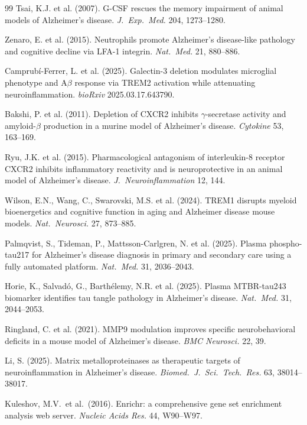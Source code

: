 \documentclass[12pt,a4paper]{article}
\begin{document}
\begin{thebibliography}{99}
 Tsai, K.J. et al. (2007). G-CSF rescues the memory impairment of animal models of Alzheimer's disease. \textit{J.\ Exp.\ Med.} 204, 1273--1280.

 Zenaro, E. et al. (2015). Neutrophils promote Alzheimer's disease-like pathology and cognitive decline via LFA-1 integrin. \textit{Nat.\ Med.} 21, 880--886.

 Camprub\'i-Ferrer, L. et al. (2025). Galectin-3 deletion modulates microglial phenotype and A$\beta$ response via TREM2 activation while attenuating neuroinflammation. \textit{bioRxiv} 2025.03.17.643790.

 Bakshi, P. et al. (2011). Depletion of CXCR2 inhibits $\gamma$-secretase activity and amyloid-$\beta$ production in a murine model of Alzheimer's disease. \textit{Cytokine} 53, 163--169.

 Ryu, J.K. et al. (2015). Pharmacological antagonism of interleukin-8 receptor CXCR2 inhibits inflammatory reactivity and is neuroprotective in an animal model of Alzheimer's disease. \textit{J.\ Neuroinflammation} 12, 144.

 Wilson, E.N., Wang, C., Swarovski, M.S. et al. (2024). TREM1 disrupts myeloid bioenergetics and cognitive function in aging and Alzheimer disease mouse models. \textit{Nat.\ Neurosci.} 27, 873--885.

 Palmqvist, S., Tideman, P., Mattsson-Carlgren, N. et al. (2025). Plasma phospho-tau217 for Alzheimer's disease diagnosis in primary and secondary care using a fully automated platform. \textit{Nat.\ Med.} 31, 2036--2043.

 Horie, K., Salvad\'o, G., Barth\'elemy, N.R. et al. (2025). Plasma MTBR-tau243 biomarker identifies tau tangle pathology in Alzheimer's disease. \textit{Nat.\ Med.} 31, 2044--2053.

 Ringland, C. et al. (2021). MMP9 modulation improves specific neurobehavioral deficits in a mouse model of Alzheimer's disease. \textit{BMC Neurosci.} 22, 39.

 Li, S. (2025). Matrix metalloproteinases as therapeutic targets of neuroinflammation in Alzheimer's disease. \textit{Biomed.\ J.\ Sci.\ Tech.\ Res.} 63, 38014--38017.

 Kuleshov, M.V.\ et al.\ (2016). Enrichr: a comprehensive gene set enrichment analysis web server. \textit{Nucleic Acids Res.} 44, W90--W97.


\end{thebibliography}
\end{document}
